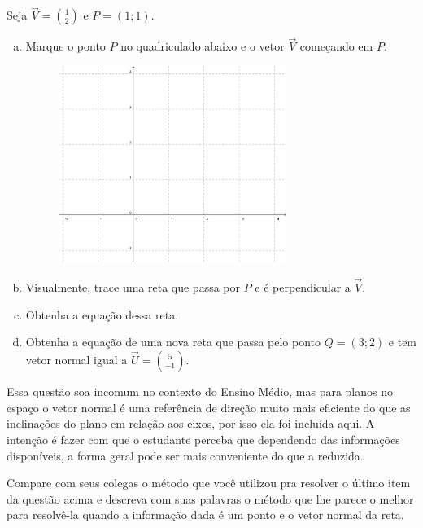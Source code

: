 \documentclass[main_estudante.tex]{subfiles}
\begin{document}
\begin{questao}
Seja $\overrightarrow{V}=\binom{1}{2}$ e $P=(1;1)$.
\begin{enumerate}[a)]
\item Marque o ponto $P$ no quadriculado abaixo e o vetor $\overrightarrow{V}$ começando em $P$.

\begin{figure}[h]
\centering
\includegraphics[width=0.7\textwidth]{./img/c6q9.png}
\end{figure}

\item Visualmente, trace uma reta que passa por $P$ e é perpendicular a $\overrightarrow{V}$.
\item Obtenha a equação dessa reta.
\item Obtenha a equação de uma nova reta que passa pelo ponto $Q=(3;2)$ e tem vetor normal igual a $\overrightarrow{U}=\binom{5}{-1}$.
\end{enumerate}
\end{questao}

Essa questão soa incomum no contexto do Ensino Médio, mas para planos no espaço o vetor normal é uma referência de direção muito mais eficiente do que as inclinações do plano em relação aos eixos, por isso ela foi incluída aqui. A intenção é fazer com que o estudante perceba que dependendo das informações disponíveis, a forma geral pode ser mais conveniente do que a reduzida.

\begin{reflita}
 Compare com seus colegas o método que você utilizou pra resolver o último item da questão acima e descreva com suas palavras o método que lhe parece o melhor para resolvê-la quando a informação dada é um ponto e o vetor normal da reta.
\end{reflita}
\end{document}
